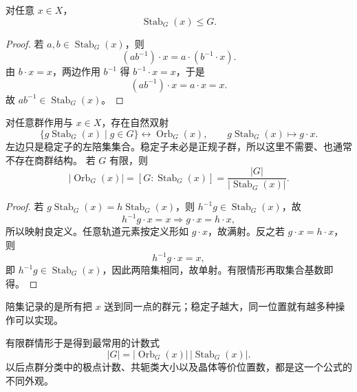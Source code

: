 \begin{proposition}[稳定子是子群]
对任意 $x\in X$，
\[
\operatorname{Stab}_G(x)\leqslant G.
\]
\label{prop:stabilizer-subgroup}

\end{proposition}

\begin{proof}
若 $a,b\in\operatorname{Stab}_G(x)$，则
\[
(ab^{-1})\cdot x
=a\cdot(b^{-1}\cdot x).
\]
由 $b\cdot x=x$，两边作用 $b^{-1}$ 得 $b^{-1}\cdot x=x$，于是
\[
(ab^{-1})\cdot x=a\cdot x=x.
\]
故 $ab^{-1}\in\operatorname{Stab}_G(x)$。
\end{proof}

\begin{theorem}[轨道--稳定子定理]
对任意群作用与 $x\in X$，存在自然双射
\[
\{g\operatorname{Stab}_G(x)\mid g\in G\}
\longleftrightarrow
\operatorname{Orb}_G(x),
\qquad
g\operatorname{Stab}_G(x)\longmapsto g\cdot x.
\label{eq:orbit-stabilizer-bijection}
\]
左边只是稳定子的左陪集集合。稳定子未必是正规子群，所以这里不需要、也通常不存在商群结构。
若 $G$ 有限，则
\[
\lvert\operatorname{Orb}_G(x)\rvert
=[G:\operatorname{Stab}_G(x)]
=\frac{\lvert G\rvert}{\lvert\operatorname{Stab}_G(x)\rvert}.
\label{eq:orbit-stabilizer}
\]
\label{thm:orbit-stabilizer}

\end{theorem}

\begin{proof}
若 $g\operatorname{Stab}_G(x)=h\operatorname{Stab}_G(x)$，则 $h^{-1}g\in\operatorname{Stab}_G(x)$，故
\[
h^{-1}g\cdot x=x
\Longrightarrow
g\cdot x=h\cdot x,
\]
所以映射良定义。任意轨道元素按定义形如 $g\cdot x$，故满射。反之若 $g\cdot x=h\cdot x$，则
\[
h^{-1}g\cdot x=x,
\]
即 $h^{-1}g\in\operatorname{Stab}_G(x)$，因此两陪集相同，故单射。有限情形再取集合基数即得。
\end{proof}

陪集记录的是所有把 $x$ 送到同一点的群元；稳定子越大，同一位置就有越多种操作可以实现。

有限群情形于是得到最常用的计数式
\[
|G|=|\operatorname{Orb}_G(x)|\,|\operatorname{Stab}_G(x)|.
\]
以后点群分类中的极点计数、共轭类大小以及晶体等价位置数，都是这一个公式的不同外观。

